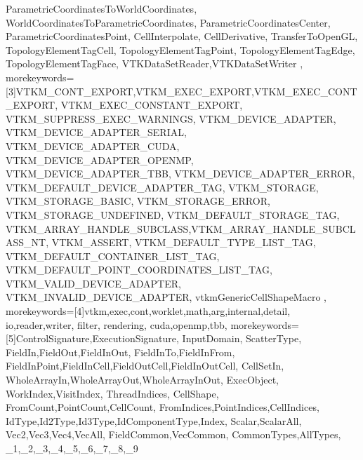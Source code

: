 {{                   ParametricCoordinatesToWorldCoordinates,
                   WorldCoordinatesToParametricCoordinates,
                   ParametricCoordinatesCenter,
                   ParametricCoordinatesPoint,
                   CellInterpolate,
                   CellDerivative,
                   TransferToOpenGL,
                   TopologyElementTagCell,
                   TopologyElementTagPoint,
                   TopologyElementTagEdge,
                   TopologyElementTagFace,
                   VTKDataSetReader,VTKDataSetWriter
                   },
  morekeywords={[3]VTKM_CONT_EXPORT,VTKM_EXEC_EXPORT,VTKM_EXEC_CONT_EXPORT,
                   VTKM_EXEC_CONSTANT_EXPORT,
                   VTKM_SUPPRESS_EXEC_WARNINGS,
                   VTKM_DEVICE_ADAPTER,
                   VTKM_DEVICE_ADAPTER_SERIAL,
                   VTKM_DEVICE_ADAPTER_CUDA,
                   VTKM_DEVICE_ADAPTER_OPENMP,
                   VTKM_DEVICE_ADAPTER_TBB,
                   VTKM_DEVICE_ADAPTER_ERROR,
                   VTKM_DEFAULT_DEVICE_ADAPTER_TAG,
                   VTKM_STORAGE,
                   VTKM_STORAGE_BASIC,
                   VTKM_STORAGE_ERROR,
                   VTKM_STORAGE_UNDEFINED,
                   VTKM_DEFAULT_STORAGE_TAG,
                   VTKM_ARRAY_HANDLE_SUBCLASS,VTKM_ARRAY_HANDLE_SUBCLASS_NT,
                   VTKM_ASSERT,
                   VTKM_DEFAULT_TYPE_LIST_TAG,
                   VTKM_DEFAULT_CONTAINER_LIST_TAG,
                   VTKM_DEFAULT_POINT_COORDINATES_LIST_TAG,
                   VTKM_VALID_DEVICE_ADAPTER,
                   VTKM_INVALID_DEVICE_ADAPTER,
                   vtkmGenericCellShapeMacro
                   },
  morekeywords={[4]vtkm,exec,cont,worklet,math,arg,internal,detail,
                   io,reader,writer,
                   filter,
                   rendering,
                   cuda,openmp,tbb},
  morekeywords={[5]ControlSignature,ExecutionSignature,
                   InputDomain,
                   ScatterType,
                   FieldIn,FieldOut,FieldInOut,
                   FieldInTo,FieldInFrom,
                   FieldInPoint,FieldInCell,FieldOutCell,FieldInOutCell,
                   CellSetIn,
                   WholeArrayIn,WholeArrayOut,WholeArrayInOut,
                   ExecObject,
                   WorkIndex,VisitIndex,
                   ThreadIndices,
                   CellShape,
                   FromCount,PointCount,CellCount,
                   FromIndices,PointIndices,CellIndices,
                   IdType,Id2Type,Id3Type,IdComponentType,Index,
                   Scalar,ScalarAll,
                   Vec2,Vec3,Vec4,VecAll,
                   FieldCommon,VecCommon,
                   CommonTypes,AllTypes,
                   _1,_2,_3,_4,_5,_6,_7,_8,_9
                   }
}
\lstset{language=VTKm}

